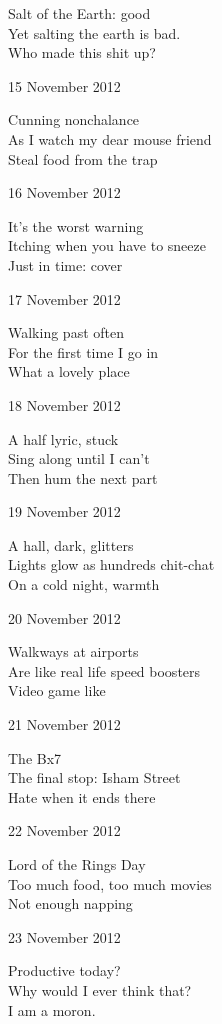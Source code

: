 \documentclass[12pt]{article}
\begin{document}
Salt of the Earth: good \\
Yet salting the earth is bad. \\
Who made this shit up?

15 November 2012

Cunning nonchalance \\
As I watch my dear mouse friend \\
Steal food from the trap

16 November 2012

It's the worst warning \\
Itching when you have to sneeze \\
Just in time: cover

\newpage

17 November 2012

Walking past often \\
For the first time I go in \\
What a lovely place

18 November 2012

A half lyric, stuck \\
Sing along until I can't \\
Then hum the next part

19 November 2012

A hall, dark, glitters \\
Lights glow as hundreds chit-chat \\
On a cold night, warmth

20 November 2012 

Walkways at airports \\
Are like real life speed boosters \\
Video game like

21 November 2012

The Bx7 \\
The final stop: Isham Street \\
Hate when it ends there

22 November 2012

Lord of the Rings Day \\
Too much food, too much movies \\
Not enough napping

23 November 2012

Productive today? \\
Why would I ever think that? \\
I am a moron.

\newpage
\end{document}
